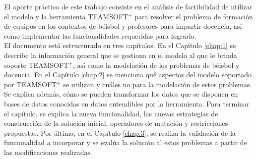\color{red}	
El aporte práctico de este trabajo consiste en el análisis de factibilidad de utilizar el modelo y la herramienta TEAMSOFT$^+$ para resolver el problema de formación de equipos en los contextos de béisbol y profesores para impartir docencia, así como implementar las funcionalidades requeridas para lograrlo.\\

El documento está estructurado en tres capítulos. En el Capítulo \ref{chap:1} se describe la información general que se gestiona en el modelo al que le brinda soporte TEAMSOFT$^+$, así como la modelación de los problemas de béisbol y docencia. En el Capítulo \ref{chap:2} se menciona qué aspectos del modelo soportado por TEAMSOFT$^+$ se utilizan y cuáles no para la modelación de estos problemas. Se explica además, cómo se pueden transformar los datos que se disponen en bases de datos conocidas \citep{INDER2020, DISERTIC2020} en datos entendibles por la herramienta. Para terminar el capítulo, se explica la nueva funcionalidad, las nuevas estrategias de construcción de la solución inicial, operadores de mutación y restricciones propuestas. Por último, en el Capítulo \ref{chap:3},  se realiza la validación de la funcionalidad a incorporar y se evalúa la solución al estos problemas a partir de las modificaciones realizadas.
\normalcolor
